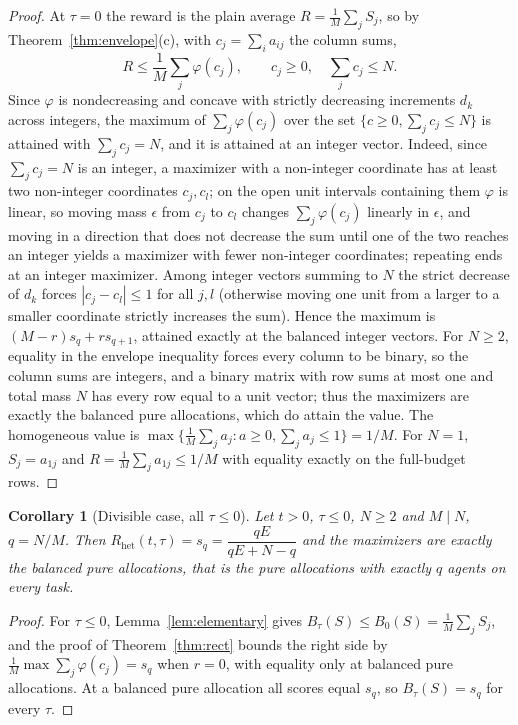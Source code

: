 \documentclass[11pt]{article}
\theoremstyle{plain}
\newtheorem{corollary}[theorem]{Corollary}
\theoremstyle{definition}
\theoremstyle{remark}
\newcommand{\Rhet}{R_{\mathrm{het}}}
\begin{document}
\begin{proof}
At $\tau=0$ the reward is the plain average $R=\frac1M\sum_jS_j$, so by Theorem~\ref{thm:envelope}(c), with $c_j=\sum_ia_{ij}$ the column sums,
\[
 R\le\frac1M\sum_j\varphi(c_j),\qquad c_j\ge0,\quad\sum_jc_j\le N .
\]
Since $\varphi$ is nondecreasing and concave with strictly decreasing increments $d_k$ across integers, the maximum of $\sum_j\varphi(c_j)$ over the set $\{c\ge0,\sum_jc_j\le N\}$ is attained with $\sum_jc_j=N$, and it is attained at an integer vector. Indeed, since $\sum_jc_j=N$ is an integer, a maximizer with a non-integer coordinate has at least two non-integer coordinates $c_j,c_l$; on the open unit intervals containing them $\varphi$ is linear, so moving mass $\epsilon$ from $c_j$ to $c_l$ changes $\sum_j\varphi(c_j)$ linearly in $\epsilon$, and moving in a direction that does not decrease the sum until one of the two reaches an integer yields a maximizer with fewer non-integer coordinates; repeating ends at an integer maximizer. Among integer vectors summing to $N$ the strict decrease of $d_k$ forces $|c_j-c_l|\le1$ for all $j,l$ (otherwise moving one unit from a larger to a smaller coordinate strictly increases the sum). Hence the maximum is $(M-r)s_q+rs_{q+1}$, attained exactly at the balanced integer vectors. For $N\ge2$, equality in the envelope inequality forces every column to be binary, so the column sums are integers, and a binary matrix with row sums at most one and total mass $N$ has every row equal to a unit vector; thus the maximizers are exactly the balanced pure allocations, which do attain the value. The homogeneous value is $\max\{\frac1M\sum_ja_j:a\ge0,\sum_ja_j\le1\}=1/M$. For $N=1$, $S_j=a_{1j}$ and $R=\frac1M\sum_ja_{1j}\le1/M$ with equality exactly on the full-budget rows.
\end{proof}

\begin{corollary}[Divisible case, all $\tau\le0$]\label{cor:divisible}
Let $t>0$, $\tau\le0$, $N\ge2$ and $M\mid N$, $q=N/M$. Then $\Rhet(t,\tau)=s_q=\dfrac{qE}{qE+N-q}$ and the maximizers are exactly the balanced pure allocations, that is the pure allocations with exactly $q$ agents on every task.
\end{corollary}

\begin{proof}
For $\tau\le0$, Lemma~\ref{lem:elementary} gives $B_\tau(S)\le B_0(S)=\frac1M\sum_jS_j$, and the proof of Theorem~\ref{thm:rect} bounds the right side by $\frac1M\max\sum_j\varphi(c_j)=s_q$ when $r=0$, with equality only at balanced pure allocations. At a balanced pure allocation all scores equal $s_q$, so $B_\tau(S)=s_q$ for every $\tau$.
\end{proof}
\end{document}
